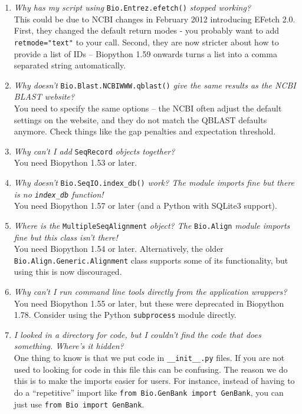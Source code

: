 \begin{enumerate}
  \item \emph{Why has my script using} \verb|Bio.Entrez.efetch()| \emph{stopped working?} \\
  This could be due to NCBI changes in February 2012 introducing EFetch 2.0.
  First, they changed the default return modes - you probably want to add \verb|retmode="text"| to
  your call.
  Second, they are now stricter about how to provide a list of IDs -- Biopython 1.59 onwards
  turns a list into a comma separated string automatically.

  \item \emph{Why doesn't} \verb|Bio.Blast.NCBIWWW.qblast()| \emph{give the same results as the NCBI BLAST website?} \\
  You need to specify the same options -- the NCBI often adjust the default settings on the website,
  and they do not match the QBLAST defaults anymore. Check things like the gap penalties and expectation threshold.

  \item \emph{Why can't I add} \verb|SeqRecord| \emph{objects together?} \\
  You need Biopython 1.53 or later.

  \item \emph{Why doesn't} \verb|Bio.SeqIO.index_db()| \emph{work? The module imports fine but there is no \texttt{index\_db} function!} \\
  You need Biopython 1.57 or later (and a Python with SQLite3 support).

  \item \emph{Where is the} \verb|MultipleSeqAlignment| \emph{object? The} \verb|Bio.Align| \emph{module imports fine but this class isn't there!} \\
  You need Biopython 1.54 or later. Alternatively, the older \verb|Bio.Align.Generic.Alignment| class supports some of its functionality, but using this is now discouraged.

  \item \emph{Why can't I run command line tools directly from the application wrappers?} \\
  You need Biopython 1.55 or later, but these were deprecated in Biopython 1.78. Consider using the Python \verb|subprocess| module directly.

  \item \emph{I looked in a directory for code, but I couldn't find the code that does something. Where's it hidden?} \\
  One thing to know is that we put code in \verb|__init__.py| files. If you are not used to looking for code in this file this can be confusing. The reason we do this is to make the imports easier for users. For instance, instead of having to do a ``repetitive'' import like \verb|from Bio.GenBank import GenBank|, you can just use \verb|from Bio import GenBank|.


\end{enumerate}
